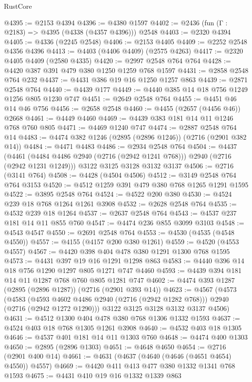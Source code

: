 \begin{lexlean}{RustCore}
\begin{coremodule}
@4395 := @2153 @4394
@4396 := @4380 @1597
@4402 := @2436 (fun (Γ : @2183) => @4395 (@4338 (@4357 @4396))) @2548
@4403 := @2320 @4394
@4405 := @4336 (@2245 @2548)
@4406 := @2153 @4405
@4409 := @2252 @2548 @4356 @4396
@4413 := @4403 (@4406 @4409) (@2575 @4263)
@4417 := @2320 @4405 @4409 (@2580 @4335)
@4420 := @2997 @2548 @764 @764
@4428 := @4420 @387 @391 @479 @380 @1250 @1259 @768 @1597
@4431 := @2858 @2548 @764 @232
@4437 := @4431 @386 @19 @16 @1250 @1257 @863
@4439 := @2871 @2548 @764
@4440 := @4439 @177
@4449 := @4440 @385 @14 @18 @756 @1249 @1256 @805 @1230 @747
@4451 := @2649 @2548 @764
@4455 := @4451 @46 @14 @46 @756
@4456 := @2658 @2548
@4460 := @4455 (@2657 (@4456 @46)) @2668
@4461 := @4449 @4460
@4469 := @4439 @383 @181 @14 @11 @1246 @768 @760 @805
@4471 := @4469 @1240 @747
@4474 := @2887 @2548 @764 @14
@4483 := @4474 @382 @1246 (@2895 (@2896 @1246)) (@2716 (@2901 @382 @14))
@4484 := @4471 @4483
@4486 := @2934 @2548 @764
@4504 := @4437
    (@4461 (@4484 @4486 @2940 (@2716 (@2942 @1241 @768))) @2940 (@2716 (@2942 @1231 @1249)))
    @3122
    @3125
    @3128
    @3132
    @3137
@4506 := @2716 (@3141 @764)
@4508 := @4428 (@4504 @4506)
@4512 := @3149 @2548 @764 @764 @3153
@4520 := @4512 @1259 @391 @479 @380 @768 @1265 @1291 @1595
@4522 := @3895 @2548 @764
@4524 := @4522 @200 @380
@4530 := @4524 @239 @18 @768 @1264 @1261 @3908
@4532 := @2628 @2548 @764
@4535 := @4532 @239 @18 @1264
@4537 := @2637 @2548 @764
@4543 := @4537 @237 @181 @14 @11 @855 @760
@4547 := @4474 @236 @855 @3099 @3103
@4548 := @4543 @4547
@4550 := @2691 @2548 @764
@4553 := @4530 (@4535 (@4548 @4550))
@4557 := @4155 (@4157 @200 @380 @1261)
@4559 := @4520 (@4553 @4557)
@4567 := @4420 @398 @404 @478 @380 @1291 @1300 @768 @1595
@4573 := @4431 @397 @19 @16 @1291 @1298 @863
@4583 := @4440 @396 @14 @18 @756 @1290 @1297 @805 @1271 @747 @4460
@4593 := @4439 @394 @181 @14 @11 @1287 @768 @760 @805 @1281 @747
@4602 := @4474 @393 @1287 (@2895 (@2896 @1287)) (@2716 (@2901 @393 @14))
@4623 := @4567
    (@4573
      (@4583 (@4593 @4602 @4486 @2940 (@2716 (@2942 @1282 @768))) @2940 (@2716 (@2942 @1272 @1290)))
      @3122
      @3125
      @3128
      @3132
      @3137
      @4506)
@4631 := @4512 @1300 @404 @478 @380 @768 @1306 @1332 @1593
@4637 := @4524 @403 @18 @768 @1305 @1261 @3908
@4640 := @4532 @403 @18 @1305
@4646 := @4537 @401 @181 @14 @11 @1303 @760
@4648 := @4474 @400 @1303
@4650 := @2895 (@2896 @1303)
@4651 := @4648 @4650
@4654 := @2716 (@2901 @400 @14)
@4661 := @4631 (@4637 (@4640 (@4646 (@4651 @4654) @4550)) @4557)
@4669 := @4420 @411 @413 @477 @380 @1332 @1341 @768 @1593
@4675 := @4431 @410 @19 @16 @1332 @1339 @863

\end{coremodule}
\end{lexlean}
